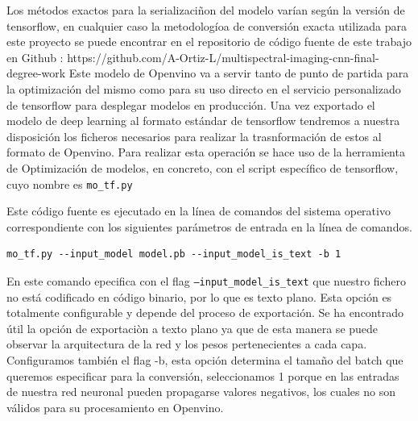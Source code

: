 Los métodos exactos para la serializaciñon del modelo varían según la versión de tensorflow, en cualquier caso la metodologíoa de conversión exacta utilizada
para este proyecto se puede encontrar en el repositorio de código fuente de este trabajo en Github : https://github.com/A-Ortiz-L/multispectral-imaging-cnn-final-degree-work
Este modelo de Openvino va a servir tanto de punto de partida para la optimización del mismo como para su uso directo en el servicio personalizado de tensorflow para desplegar
modelos en producción.
Una vez exportado el modelo de deep learning al formato estándar de tensorflow tendremos a nuestra disposición los ficheros necesarios para realizar la trasnformación de estos al formato de Openvino.
Para realizar esta operación se hace uso de la herramienta de Optimización de modelos, en concreto, con el script específico de tensorflow, cuyo nombre
es \texttt{mo\_tf.py}


Este código fuente es ejecutado en la línea de comandos del sistema operativo correspondiente con los siguientes parámetros de entrada en la línea de comandos.


\begin{lstlisting}[caption=Comando de terminal para convertir un modelo tensorflow a uno de openvino.,
  label=a_label,
  float=t]
    mo_tf.py --input_model model.pb --input_model_is_text -b 1
\end{lstlisting}

En este comando epecifica con el flag \texttt{--input\_model\_is\_text} que nuestro fichero no está codificado en código binario, por lo que es texto plano.
Esta opción es totalmente configurable y depende del proceso de exportación.
Se ha encontrado útil la opción de exportaciòn a texto plano ya que de esta manera
se puede observar la arquitectura de la red y los pesos pertenecientes a cada capa.
Configuramos también el flag -b, esta opción determina el tamaño del batch que queremos especificar para la conversión, seleccionamos 1 porque en las entradas de nuestra red neuronal pueden propagarse valores
negativos, los cuales no son válidos para su procesamiento en Openvino.

